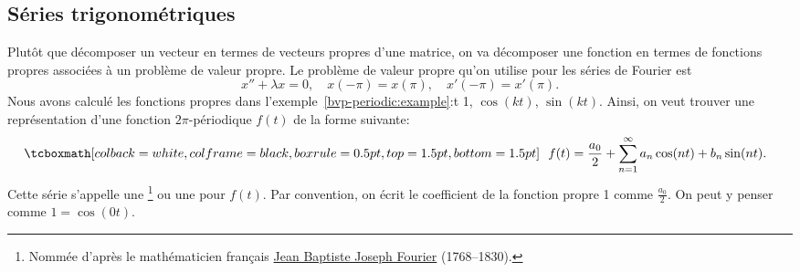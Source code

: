 \subsection{Séries trigonométriques}

Plutôt que décomposer un vecteur en termes de vecteurs propres d'une matrice, on va décomposer une fonction en termes de fonctions propres associées à un problème de valeur propre. Le problème de valeur propre qu'on utilise pour les séries de Fourier est 
\begin{equation*}
x'' + \lambda x = 0, \quad x(-\pi) = x(\pi), \quad x'(-\pi) = x'(\pi) .
\end{equation*}
Nous avons calculé les fonctions propres dans l'exemple~\ref{bvp-periodic:example}:t 1, $\cos (k t)$,
$\sin (k t)$.  Ainsi, on veut trouver une représentation d'une fonction 
$2\pi$-périodique $f(t)$ de la forme suivante: 
\begin{equation*}
\mybxbg{~~
f(t) = \frac{a_0}{2} +
\sum_{n=1}^\infty a_n \cos (n t) + b_n \sin (n t) .
~~}
\end{equation*}
Cette série s'appelle une  \emph{}%
\footnote{Nommée d'après le mathématicien français
\href{https://en.wikipedia.org/wiki/Joseph_Fourier}{Jean Baptiste Joseph Fourier}
(1768--1830).} ou une
\emph{} pour $f(t)$.
Par convention, on écrit le coefficient de la fonction propre 1 comme $\frac{a_0}{2}$. On peut y penser comme $1 = \cos (0t)$.

